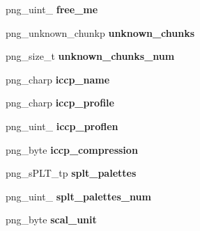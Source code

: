 \begin{DoxyCompactItemize}
\item 
\hypertarget{structpng__info__struct_ac8cd35d4981fab722fb789cfdd8d531e}{png\+\_\+uint\+\_ {\bfseries free\+\_\+me}}\label{structpng__info__struct_ac8cd35d4981fab722fb789cfdd8d531e}

\item 
\hypertarget{structpng__info__struct_a216ae5fb1daff66f9d461d1b1dbb6254}{png\+\_\+unknown\+\_\+chunkp {\bfseries unknown\+\_\+chunks}}\label{structpng__info__struct_a216ae5fb1daff66f9d461d1b1dbb6254}

\item 
\hypertarget{structpng__info__struct_a611e68d5c8760d5dde85a44ec298d456}{png\+\_\+size\+\_\+t {\bfseries unknown\+\_\+chunks\+\_\+num}}\label{structpng__info__struct_a611e68d5c8760d5dde85a44ec298d456}

\item 
\hypertarget{structpng__info__struct_ab76fd30aae356df7f503ada284fbb74f}{png\+\_\+charp {\bfseries iccp\+\_\+name}}\label{structpng__info__struct_ab76fd30aae356df7f503ada284fbb74f}

\item 
\hypertarget{structpng__info__struct_a3fc961c3925051a702b9177227702e3b}{png\+\_\+charp {\bfseries iccp\+\_\+profile}}\label{structpng__info__struct_a3fc961c3925051a702b9177227702e3b}

\item 
\hypertarget{structpng__info__struct_a87ad6f4d5e29d5c264ca8381ff0161ae}{png\+\_\+uint\+\_ {\bfseries iccp\+\_\+proflen}}\label{structpng__info__struct_a87ad6f4d5e29d5c264ca8381ff0161ae}

\item 
\hypertarget{structpng__info__struct_a834367da72c7dee66161ce4cdabe3d9a}{png\+\_\+byte {\bfseries iccp\+\_\+compression}}\label{structpng__info__struct_a834367da72c7dee66161ce4cdabe3d9a}

\item 
\hypertarget{structpng__info__struct_a9df3d46242c72bbea6d9ca81c7e183f5}{png\+\_\+s\+P\+L\+T\+\_\+tp {\bfseries splt\+\_\+palettes}}\label{structpng__info__struct_a9df3d46242c72bbea6d9ca81c7e183f5}

\item 
\hypertarget{structpng__info__struct_a54b9d91e879bab87f3b9219a9528fcf1}{png\+\_\+uint\+\_ {\bfseries splt\+\_\+palettes\+\_\+num}}\label{structpng__info__struct_a54b9d91e879bab87f3b9219a9528fcf1}

\item 
\hypertarget{structpng__info__struct_a05d48b7629ee75b0d6df1311cb11e82e}{png\+\_\+byte {\bfseries scal\+\_\+unit}}\label{structpng__info__struct_a05d48b7629ee75b0d6df1311cb11e82e}


\end{DoxyCompactItemize}
